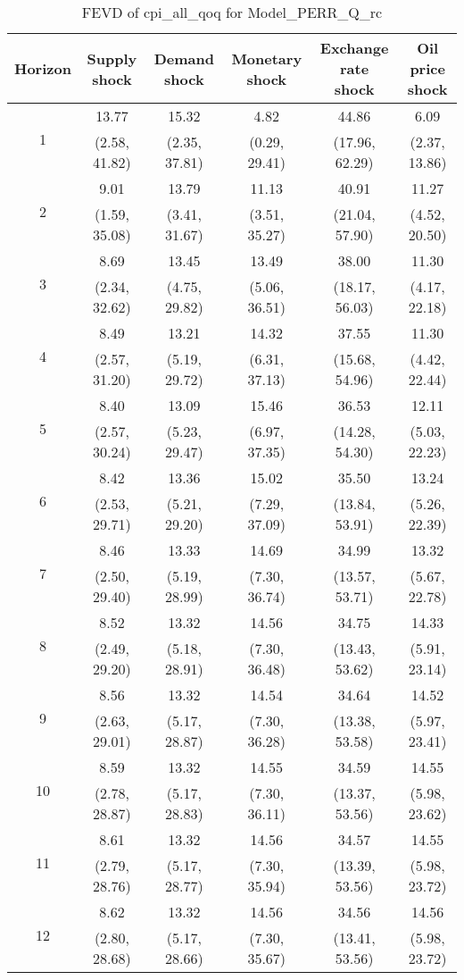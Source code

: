 \documentclass{article}
\begin{document}
\begin{table}
	\footnotesize
	\caption{FEVD of cpi_all_qoq for Model_PERR_Q_rc}
	\begin{tabular}{cccccc}
		Horizon & Supply shock & Demand shock & Monetary shock & Exchange rate shock & Oil price shock\\ \hline
		\multirow{2}{*}{1} & 13.77 & 15.32 & 4.82 & 44.86 & 6.09\\
		 & (2.58, 41.82) & (2.35, 37.81) & (0.29, 29.41) & (17.96, 62.29) & (2.37, 13.86)\\
		\multirow{2}{*}{2} & 9.01 & 13.79 & 11.13 & 40.91 & 11.27\\
		 & (1.59, 35.08) & (3.41, 31.67) & (3.51, 35.27) & (21.04, 57.90) & (4.52, 20.50)\\
		\multirow{2}{*}{3} & 8.69 & 13.45 & 13.49 & 38.00 & 11.30\\
		 & (2.34, 32.62) & (4.75, 29.82) & (5.06, 36.51) & (18.17, 56.03) & (4.17, 22.18)\\
		\multirow{2}{*}{4} & 8.49 & 13.21 & 14.32 & 37.55 & 11.30\\
		 & (2.57, 31.20) & (5.19, 29.72) & (6.31, 37.13) & (15.68, 54.96) & (4.42, 22.44)\\
		\multirow{2}{*}{5} & 8.40 & 13.09 & 15.46 & 36.53 & 12.11\\
		 & (2.57, 30.24) & (5.23, 29.47) & (6.97, 37.35) & (14.28, 54.30) & (5.03, 22.23)\\
		\multirow{2}{*}{6} & 8.42 & 13.36 & 15.02 & 35.50 & 13.24\\
		 & (2.53, 29.71) & (5.21, 29.20) & (7.29, 37.09) & (13.84, 53.91) & (5.26, 22.39)\\
		\multirow{2}{*}{7} & 8.46 & 13.33 & 14.69 & 34.99 & 13.32\\
		 & (2.50, 29.40) & (5.19, 28.99) & (7.30, 36.74) & (13.57, 53.71) & (5.67, 22.78)\\
		\multirow{2}{*}{8} & 8.52 & 13.32 & 14.56 & 34.75 & 14.33\\
		 & (2.49, 29.20) & (5.18, 28.91) & (7.30, 36.48) & (13.43, 53.62) & (5.91, 23.14)\\
		\multirow{2}{*}{9} & 8.56 & 13.32 & 14.54 & 34.64 & 14.52\\
		 & (2.63, 29.01) & (5.17, 28.87) & (7.30, 36.28) & (13.38, 53.58) & (5.97, 23.41)\\
		\multirow{2}{*}{10} & 8.59 & 13.32 & 14.55 & 34.59 & 14.55\\
		 & (2.78, 28.87) & (5.17, 28.83) & (7.30, 36.11) & (13.37, 53.56) & (5.98, 23.62)\\
		\multirow{2}{*}{11} & 8.61 & 13.32 & 14.56 & 34.57 & 14.55\\
		 & (2.79, 28.76) & (5.17, 28.77) & (7.30, 35.94) & (13.39, 53.56) & (5.98, 23.72)\\
		\multirow{2}{*}{12} & 8.62 & 13.32 & 14.56 & 34.56 & 14.56\\
		 & (2.80, 28.68) & (5.17, 28.66) & (7.30, 35.67) & (13.41, 53.56) & (5.98, 23.72)\\
	\end{tabular}
\label{tab:fevd-Model_PERR_Q_rc-cpi_all_qoq}
\end{table}
\end{document}

